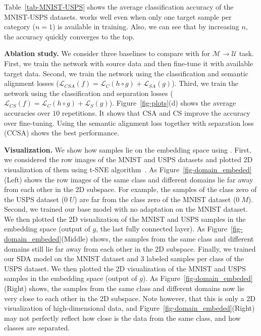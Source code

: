 Table~\ref{tab-MNIST-USPS} shows the average classification accuracy of the MNIST-USPS datasets. \modelDA works well even when only one target sample per category ($n=1$) is available in training. Also, we can see that by increasing $n$, the accuracy quickly converges to the top.

\noindent \textbf{Ablation study.} We consider three baselines to compare with \modelDA  for $\mathcal{M} \rightarrow \mathcal{U}$ task. First, we train the network with source data and then fine-tune it with available target data. Second, we train the network using the classification and semantic
alignment losses ($\mathcal{L}_{CSA} (f) = \mathcal{L}_{C} (h\circ g) + \mathcal{L}_{SA} (g)$). Third, we train the network using the classification and separation losses ($\mathcal{L}_{CS} (f) = \mathcal{L}_{C} (h\circ g) + \mathcal{L}_{S} (g)$). Figure~\ref{fig-plots}(d) shows the average accuracies over $10$ repetitions. It shows that CSA and CS improve the accuracy over fine-tuning. Using the semantic alignment loss together with separation loss (CCSA) shows the best performance.


\noindent \textbf{Visualization.} We show how samples lie on the embedding space using \modelDA. First, we considered the row images of the MNIST and USPS datasets and plotted 2D visualization of them using t-SNE algorithm~\cite{maaten2008visualizing}. As Figure~\ref{fig-domain_embeded}(Left) shows the row images of the same class and different domains lie far away from each other in the 2D subspace. For example, the samples of the class zero of the USPS dataset ($0\; U$) are far from the class zero of the MNIST dataset ($0\; M$). Second, we trained our base model with no adaptation on the MNIST dataset. We then plotted the 2D visualization of the MNIST and USPS samples in the embedding space (output of $g$, the last fully connected layer). As Figure~\ref{fig-domain_embeded}(Middle) shows, the samples from the same class and different domains still lie far away from each other in the 2D subspace. Finally, we trained our SDA model on the MNIST dataset and $3$ labeled samples per class of the USPS dataset. We then plotted the 2D visualization of the MNIST and USPS samples in the embedding space (output of $g$). As Figure~\ref{fig-domain_embeded}(Right) shows, the samples from the same class and different domains now lie very close to each other in the 2D subspace. Note however, that this is only a 2D visualization of high-dimensional data, and Figure~\ref{fig-domain_embeded}(Right) may not perfectly reflect how close is the data from the same class, and how classes are separated.

